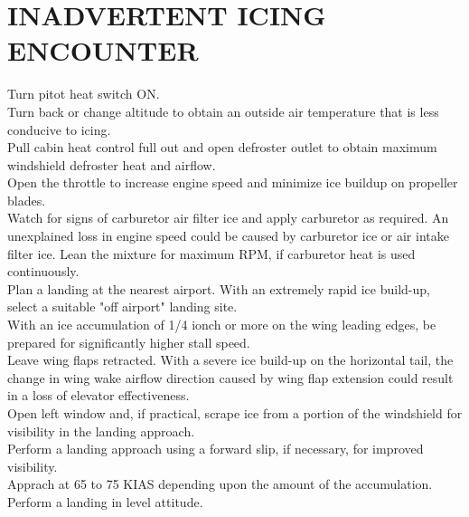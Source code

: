 \documentclass{article}
\begin{document}
\section*{INADVERTENT ICING ENCOUNTER}
\begin{flushleft}
Turn pitot heat switch ON.\\
Turn back or change altitude to obtain an outside air temperature that is less conducive to icing.\\
Pull cabin heat control full out and open defroster outlet to obtain maximum windshield defroster heat and airflow.\\
Open the throttle to increase engine speed and minimize ice buildup on propeller blades.\\
Watch for signs of carburetor air filter ice and apply carburetor as required. An unexplained loss in engine speed could be caused by carburetor ice or air intake filter ice. Lean the mixture for maximum RPM, if carburetor heat is used continuously.\\
Plan a landing at the nearest airport. With an extremely rapid ice build-up, select a suitable "off airport" landing site.\\
With an ice accumulation of 1/4 ionch or more on the wing leading edges, be prepared for significantly higher stall speed.\\
Leave wing flaps retracted. With a severe ice build-up on the horizontal tail, the change in wing wake airflow direction caused by wing flap extension could result in a loss of elevator effectiveness.\\
Open left window and, if practical, scrape ice from a portion of the windshield for visibility in the landing approach.\\
Perform a landing approach using a forward slip, if necessary, for improved visibility.\\
Apprach at 65 to 75 KIAS depending upon the amount of the accumulation.\\
Perform a landing in level attitude.
\end{flushleft}
\end{document}
